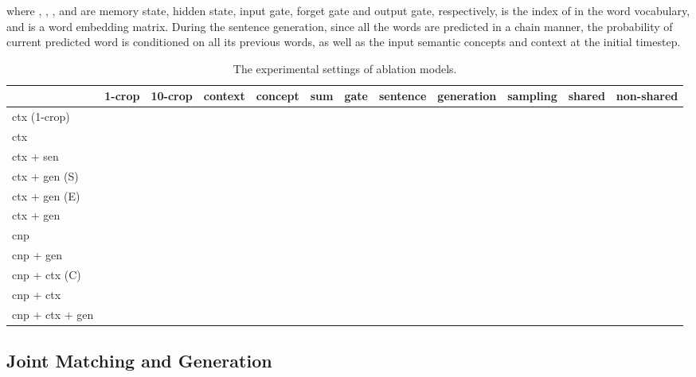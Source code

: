 \documentclass[10pt,twocolumn,letterpaper]{article}
\begin{document}
where , , ,
 and  are memory state, hidden state,
input gate, forget gate and output gate, respectively,
 is the index of  in the word vocabulary,
and  is a word embedding matrix.
During the sentence generation,
since all the words are predicted in a chain manner,
the probability  of current predicted word
is conditioned on all its previous words,
as well as the input semantic concepts  and context  at the initial timestep.








\begin{table*}[t] \small
\addtolength{\tabcolsep}{-2pt}
\centering
\caption{The experimental settings of ablation models.}
\begin{tabular}{l|cc|cc|cc|ccc|cc}
\hline
\hline

       & 1-crop & 10-crop  & context  & concept  & sum  & gate & sentence  & generation  & sampling & shared & non-shared\\
\hline



ctx (1-crop)          &  & & & & & & & & & & \\
ctx                     & & & & & & & & & & & \\
\hline
ctx + sen     & & & & & & & & & & & \\
ctx + gen (S)     & & & & & & & & & & & \\
ctx + gen (E)     & & & & & & & & & & & \\
ctx + gen                 & & & & & & & & & & & \\
\hline
cnp                   & & & & & & & & & & & \\
cnp + gen          & & & & & & & & & & & \\
cnp + ctx (C)     & & & & & & & & & & & \\
cnp + ctx        & & & & & & & & & & & \\
\hline
cnp + ctx + gen     & & & & & & & & & & & \\


\hline
\hline
\end{tabular}

\label{table:ablation}
\end{table*}



\subsection{Joint Matching and Generation}
\end{document}
